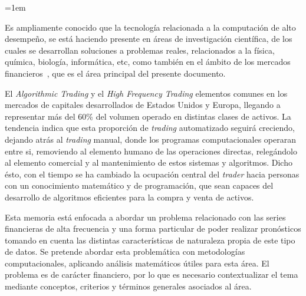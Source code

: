 \parindent=1em

Es ampliamente conocido que la tecnología relacionada a la computación
de alto desempeño, se está haciendo presente en áreas de investigación
científica, de los cuales se desarrollan soluciones a problemas reales,
relacionados a la física, química, biología, informática, etc, como también
en el ámbito de los mercados financieros~\citep{watsham1997quantitative},
que es el área principal del presente documento.

El \emph{Algorithmic Trading} y el \emph{High Frequency Trading} elementos
comunes en los mercados de capitales desarrollados de Estados Unidos y Europa,
llegando a representar más del 60\% del volumen operado en distintas clases de
activos. 
La tendencia indica que esta proporción de \emph{trading} automatizado seguirá
creciendo, dejando atrás al \emph{trading} manual, donde los programas
computacionales operaran entre si, removiendo al elemento humano de las
operaciones directas, relegándolo al elemento comercial y al mantenimiento de
estos sistemas y algoritmos. 
Dicho ésto, con el tiempo se ha cambiado la ocupación central del \emph{trader}
hacia personas con un conocimiento matemático y de programación,
que sean capaces del desarrollo de algoritmos eficientes para la compra y venta
de activos.

Esta memoria está enfocada a abordar un problema relacionado con las series
financieras de alta frecuencia y una forma particular de poder realizar
pronósticos tomando en cuenta las distintas características de naturaleza
propia de este tipo de datos. Se pretende abordar esta problemática con
metodologías computacionales, aplicando análisis matemáticos útiles para esta
área. El problema es de carácter financiero, por lo que es necesario
contextualizar el tema mediante conceptos, criterios y términos generales
asociados al área.

